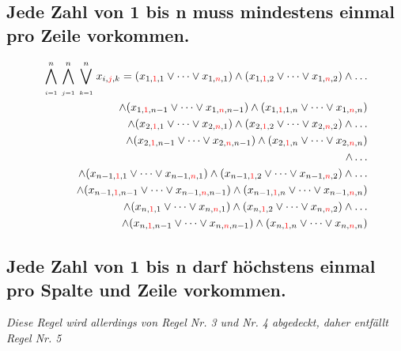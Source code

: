 \documentclass[11pt, a4paper]{article}
\begin{document}
	\subsection{Jede Zahl von 1 bis n muss mindestens einmal pro Zeile vorkommen.}
	\begin{align*}
		\bigwedge_{\atop i=1}^n \bigwedge_{\atop j=1}^n \bigvee_{\atop k=1}^n
		x_{i,{\color{red} j},k} = (x_{1,{\color{red}1},1} \vee \dots \vee x_{1,{\color{red} n},1})
		\wedge (x_{1,{\color{red} 1},2} \vee \dots \vee x_{1,{\color{red} n},2})
		\wedge \dots \\
		\wedge (x_{1,{\color{red}1},n-1} \vee \dots \vee x_{1,{\color{red} n},n-1})
		\wedge (x_{1,{\color{red} 1},1,n} \vee \dots \vee x_{1,{\color{red} n},n}) \\
		\wedge (x_{2,{\color{red}1},1} \vee \dots \vee x_{2,{\color{red} n},1})
		\wedge (x_{2,{\color{red} 1},2} \vee \dots \vee x_{2,{\color{red} n},2})
		\wedge \dots \\
		\wedge (x_{2,{\color{red}1},n-1} \vee \dots \vee x_{2,{\color{red} n},n-1})
		\wedge (x_{2,{\color{red} 1},n} \vee \dots \vee x_{2,{\color{red} n},n})
		\\ \wedge \dots \\
		\wedge (x_{n-1,{\color{red}1},1} \vee \dots \vee x_{n-1,{\color{red} n},1})
		\wedge (x_{n-1,{\color{red} 1},2} \vee \dots \vee x_{n-1,{\color{red} n},2})
		\wedge \dots \\
		\wedge (x_{n-1,{\color{red}1},n-1} \vee \dots \vee x_{n-1,{\color{red} n},n-1})
		\wedge (x_{n-1,{\color{red} 1},n} \vee \dots \vee x_{n-1,{\color{red} n},n}) \\
		\wedge (x_{n,{\color{red}1},1} \vee \dots \vee x_{n,{\color{red} n},1})
		\wedge (x_{n,{\color{red} 1},2} \vee \dots \vee x_{n,{\color{red} n},2})
		\wedge \dots \\
		\wedge (x_{n,{\color{red}1},n-1} \vee \dots \vee x_{n,{\color{red} n},n-1})
		\wedge (x_{n,{\color{red} 1},n} \vee \dots \vee x_{n,{\color{red} n},n})
	\end{align*}
	\bigskip
		
	\subsection{Jede Zahl von 1 bis n darf höchstens einmal pro Spalte und Zeile vorkommen.}
	
	\textit{Diese Regel wird allerdings von Regel Nr. 3 und Nr. 4 abgedeckt, daher entfällt Regel Nr. 5}
	\bigskip
	
\end{document}
